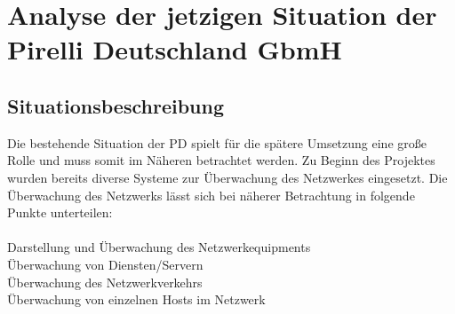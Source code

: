 \chapter{Analyse der jetzigen Situation der Pirelli Deutschland GbmH}
\label{cha:analyse}

\section{Situationsbeschreibung}
\label{sec:situation}

Die bestehende Situation der PD spielt für die spätere Umsetzung eine große Rolle und muss somit im Näheren betrachtet werden.
Zu Beginn des Projektes wurden bereits diverse Systeme zur Überwachung des Netzwerkes eingesetzt.
Die Überwachung des Netzwerks lässt sich bei näherer Betrachtung in folgende Punkte unterteilen:\\
\\
Darstellung und Überwachung des Netzwerkequipments\\
Überwachung von Diensten/Servern\\
Überwachung des Netzwerkverkehrs\\
Überwachung von einzelnen Hosts im Netzwerk\\

